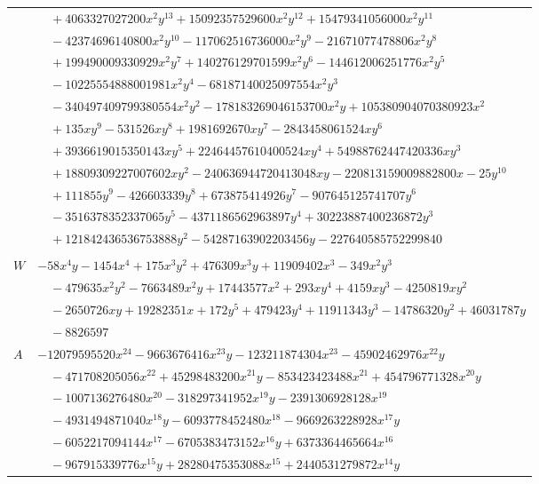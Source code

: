 \documentclass[11pt]{article}
\begin{document}
\begin{longtable}{@{}ll@{}}
 & $\quad +4063327027200x^{2}y^{13}+15092357529600x^{2}y^{12}+15479341056000x^{2}y^{11}$\\
 & $\quad -42374696140800x^{2}y^{10}-117062516736000x^{2}y^{9}-21671077478806x^{2}y^{8}$\\
 & $\quad +199490009330929x^{2}y^{7}+140276129701599x^{2}y^{6}-144612006251776x^{2}y^{5}$\\
 & $\quad -10225554888001981x^{2}y^{4}-68187140025097554x^{2}y^{3}$\\
 & $\quad -340497409799380554x^{2}y^{2}-178183269046153700x^{2}y+105380904070380923x^{2}$\\
 & $\quad +135xy^{9}-531526xy^{8}+1981692670xy^{7}-2843458061524xy^{6}$\\
 & $\quad +3936619015350143xy^{5}+22464457610400524xy^{4}+54988762447420336xy^{3}$\\
 & $\quad +18809309227007602xy^{2}-240636944720413048xy-220813159009882800x-25y^{10}$\\
 & $\quad +111855y^{9}-426603339y^{8}+673875414926y^{7}-907645125741707y^{6}$\\
 & $\quad -3516378352337065y^{5}-4371186562963897y^{4}+30223887400236872y^{3}$\\
 & $\quad +121842436536753888y^{2}-54287163902203456y-227640585752299840$\\
\addlinespace[3pt]
\multicolumn{2}{@{}l}{$i=3$, $m=12288$, neighbours $0,46,55,100,101,102,115,116,117,136,158,165,182,197$}\\
$W$ & $-58x^{4}y-1454x^{4}+175x^{3}y^{2}+476309x^{3}y+11909402x^{3}-349x^{2}y^{3}$\\
 & $\quad -479635x^{2}y^{2}-7663489x^{2}y+17443577x^{2}+293xy^{4}+4159xy^{3}-4250819xy^{2}$\\
 & $\quad -2650726xy+19282351x+172y^{5}+479423y^{4}+11911343y^{3}-14786320y^{2}+46031787y$\\
 & $\quad -8826597$\\
$A$ & $-12079595520x^{24}-9663676416x^{23}y-123211874304x^{23}-45902462976x^{22}y$\\
 & $\quad -471708205056x^{22}+45298483200x^{21}y-853423423488x^{21}+454796771328x^{20}y$\\
 & $\quad -1007136276480x^{20}-318297341952x^{19}y-2391306928128x^{19}$\\
 & $\quad -4931494871040x^{18}y-6093778452480x^{18}-9669263228928x^{17}y$\\
 & $\quad -6052217094144x^{17}-6705383473152x^{16}y+6373364465664x^{16}$\\
 & $\quad -967915339776x^{15}y+28280475353088x^{15}+2440531279872x^{14}y$\\

\end{longtable}
\end{document}
